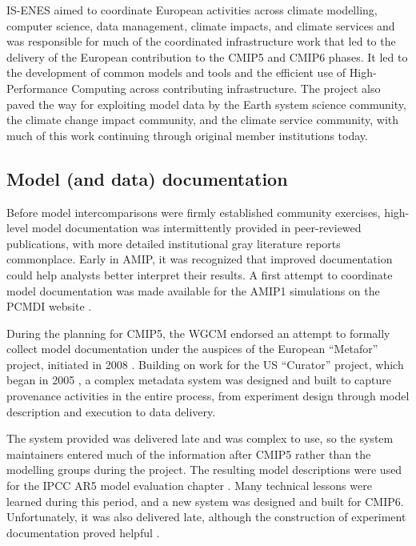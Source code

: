 \documentclass[manuscript]{copernicus}
\def\cred#1{{\color{red}#1}}
\begin{document}
IS-ENES aimed to coordinate European activities across climate modelling, computer science, data management, climate impacts, and climate services and was responsible for much of the coordinated infrastructure work that led to the delivery of the European contribution to the CMIP5 and CMIP6 phases. It led to the development of common models and tools and the efficient use of High-Performance Computing across contributing infrastructure. The project also paved the way for exploiting model data by the Earth system science community, the climate change impact community, and the climate service community, with much of this work continuing through original member institutions today.


\subsection{Model (and data) documentation}
\label{sec:ModelDocumentation}

Before model intercomparisons were firmly established community exercises, high-level model documentation was intermittently provided in peer-reviewed publications, with more detailed institutional gray literature reports commonplace. Early in AMIP, it was recognized that improved documentation could help analysts better interpret their results. A first attempt to coordinate model documentation was made available for the AMIP1 simulations on the PCMDI website \citep{phillips_documentation_1996}.

During the planning for CMIP5, the WGCM endorsed an attempt to formally collect model documentation under the auspices of the European ``Metafor'' project, initiated in 2008 \citep{guilyardi_cmip5_2011,lawrence_describing_2012}. Building on work for the US ``Curator'' project, which began in 2005 \citep{dunlap_earth_2008}, a complex metadata system was designed and built to capture provenance activities in the entire process, from experiment design through model description and execution to data delivery. 

The system provided was delivered late and was complex to use, so the system maintainers entered much of the information after CMIP5 rather than the modelling groups during the project. The resulting model descriptions were used for the IPCC AR5 model evaluation chapter \citep{flato_evaluation_2013}. Many technical lessons were learned during this period, and a new system was designed and built for CMIP6. Unfortunately, it was also delivered late, although the construction of experiment documentation proved helpful \citep{pascoe_documenting_2020}.
\end{document}
